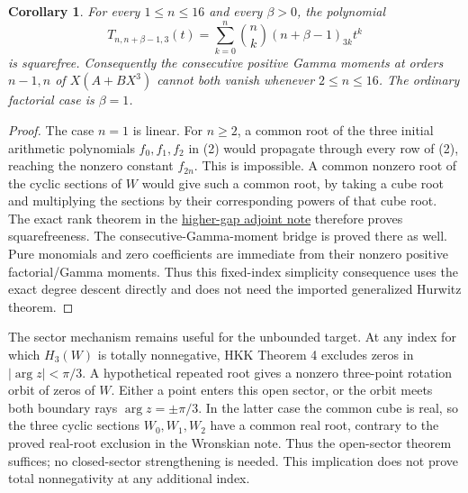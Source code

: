 \documentclass[11pt]{article}
\newtheorem{corollary}[theorem]{Corollary}
\begin{document}
\begin{corollary}\label{cor:block}
For every $1\le n\le16$ and every $\beta>0$, the polynomial
\[
 T_{n,n+\beta-1,3}(t)=\sum_{k=0}^n\binom nk(n+\beta-1)_{3k}t^k
\]
is squarefree. Consequently the consecutive positive Gamma moments
at orders $n-1,n$ of $X(A+BX^3)$ cannot both vanish whenever
$2\le n\le16$. The ordinary factorial case is $\beta=1$.
\end{corollary}
\begin{proof}
The case $n=1$ is linear. For $n\ge2$, a common root of the three
initial arithmetic polynomials $f_0,f_1,f_2$ in (2) would propagate
through every row of (2), reaching the nonzero constant $f_{2n}$.
This is impossible. A common nonzero root of the cyclic sections of
$W$ would give such a common root, by taking a cube root and multiplying
the sections by their corresponding powers of that cube root.
The exact rank theorem in the
\href{HIGHER_GAP_ADJOINT_RANK.tex}{higher-gap adjoint note} therefore
proves squarefreeness. The consecutive-Gamma-moment bridge is proved
there as well. Pure monomials and zero coefficients are immediate
from their nonzero positive factorial/Gamma moments.
Thus this fixed-index simplicity consequence uses the exact degree
descent directly and does not need the imported generalized Hurwitz theorem.
\end{proof}

The sector mechanism remains useful for the unbounded target.
At any index for which $H_3(W)$ is totally nonnegative, HKK Theorem 4
excludes zeros in $|\arg z|<\pi/3$.
A hypothetical repeated root gives a nonzero three-point rotation
orbit of zeros of $W$. Either a point enters this open sector, or the
orbit meets both boundary rays $\arg z=\pm\pi/3$.
In the latter case the common cube is real, so the three cyclic
sections $W_0,W_1,W_2$ have a common real root, contrary to the proved
real-root exclusion in the Wronskian note.
Thus the open-sector theorem suffices; no closed-sector strengthening
is needed. This implication does not prove total nonnegativity at
any additional index.
\end{document}
